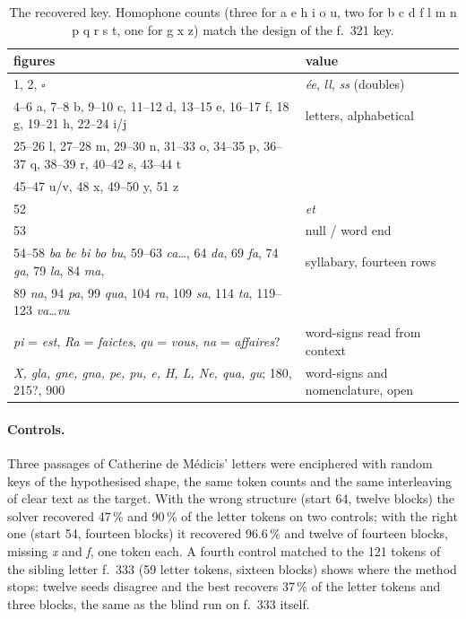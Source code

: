 \documentclass[11pt]{article}
\begin{document}
\begin{table}[t]
\centering\small
\begin{tabular}{@{}ll@{}}
\toprule
figures & value \\
\midrule
1, 2, $\square$ & \emph{\'ee}, \emph{ll}, \emph{ss} (doubles) \\
4--6 a, 7--8 b, 9--10 c, 11--12 d, 13--15 e, 16--17 f, 18 g, 19--21 h, 22--24 i/j & letters, alphabetical \\
25--26 l, 27--28 m, 29--30 n, 31--33 o, 34--35 p, 36--37 q, 38--39 r, 40--42 s, 43--44 t & \\
45--47 u/v, 48 x, 49--50 y, 51 z & \\
52 & \emph{et} \\
53 & null / word end \\
54--58 \emph{ba be bi bo bu}, 59--63 \emph{ca}\ldots, 64 \emph{da}, 69 \emph{fa}, 74 \emph{ga}, 79 \emph{la}, 84 \emph{ma}, & syllabary, fourteen rows \\
89 \emph{na}, 94 \emph{pa}, 99 \emph{qua}, 104 \emph{ra}, 109 \emph{sa}, 114 \emph{ta}, 119--123 \emph{va}\ldots\emph{vu} & \\
\emph{pi} = \emph{est}, \emph{Ra} = \emph{faictes}, \emph{qu} = \emph{vous}, \emph{na} = \emph{affaires}? & word-signs read from context \\
\emph{X, gla, gne, gna, pe, pu, e, H, L, Ne, qua, gu}; 180, 215?, 900 & word-signs and nomenclature, open \\
\bottomrule
\end{tabular}
\caption{\label{tab:key} The recovered key. Homophone counts (three for a e h i o u, two for b c d f l m n p q r s t, one for g x z) match the design of the f.~321 key.}
\end{table}

\paragraph{Controls.} Three passages of Catherine de M\'edicis' letters were enciphered with random keys of the hypothesised shape, the same token counts and the same interleaving of clear text as the target. With the wrong structure (start 64, twelve blocks) the solver recovered 47\,\% and 90\,\% of the letter tokens on two controls; with the right one (start 54, fourteen blocks) it recovered 96.6\,\% and twelve of fourteen blocks, missing \emph{x} and \emph{f}, one token each. A fourth control matched to the 121 tokens of the sibling letter f.~333 (59 letter tokens, sixteen blocks) shows where the method stops: twelve seeds disagree and the best recovers 37\,\% of the letter tokens and three blocks, the same as the blind run on f.~333 itself.
\end{document}
